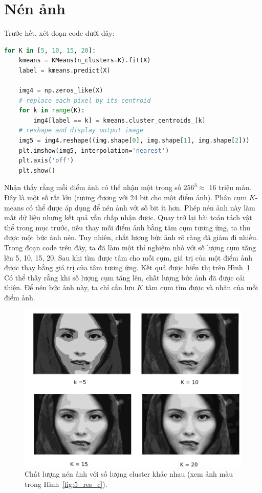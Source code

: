 \section{Nén ảnh}

Trước hết, xét đoạn code dưới đây:

\begin{lstlisting}[language=Python]
for K in [5, 10, 15, 20]:
    kmeans = KMeans(n_clusters=K).fit(X)
    label = kmeans.predict(X)

    img4 = np.zeros_like(X)
    # replace each pixel by its centroid
    for k in range(K):
        img4[label == k] = kmeans.cluster_centroids_[k]
    # reshape and display output image
    img5 = img4.reshape((img.shape[0], img.shape[1], img.shape[2]))
    plt.imshow(img5, interpolation='nearest')
    plt.axis('off')
    plt.show()
\end{lstlisting}

Nhận thấy rằng mỗi điểm ảnh có thể nhận một trong số $256^3 \approx $ 16 triệu
màu. Đây là một số rất lớn (tương đương với 24 bit cho một điểm ảnh). Phân cụm
$K$-means có thể được áp dụng để nén ảnh với số bit ít hơn. Phép nén ảnh này làm
mất dữ liệu nhưng kết quả vẫn chấp nhận được. Quay trở lại bài toán tách vật thể
trong mục trước, nếu thay mỗi điểm ảnh bằng tâm cụm tương ứng, ta thu được một
bức ảnh nén. Tuy nhiên, chất lượng bức ảnh rõ ràng đã giảm đi nhiều. Trong đoạn
code trên đây, ta đã làm một thí nghiệm nhỏ với số lượng cụm tăng lên 5, 10, 15,
20. Sau khi tìm được tâm cho mỗi cụm, giá trị của một điểm ảnh được thay bằng
giá trị của tâm tương ứng. Kết quả được hiển thị trên Hình~\ref{fig:5_res}. Có
thể thấy rằng khi số lượng cụm tăng lên, chất lượng bức ảnh đã được cải thiện.
Để nén bức ảnh này, ta chỉ cần lưu $K$ tâm cụm tìm được và nhãn của mỗi điểm
ảnh.



\begin{figure}[t]
\centering
    \includegraphics[width = \textwidth]{Chapters/03_SimpleML/4_kmeans/girl_all_gray.png}
    \caption[]{Chất lượng nén ảnh với số lượng cluster khác nhau (xem ảnh màu trong Hình~\ref{fig:5_res_c}).}
    \label{fig:5_res}
\end{figure}


